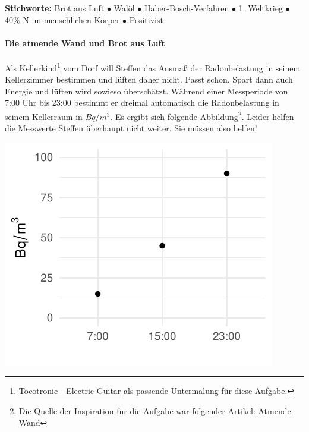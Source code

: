 \documentclass[a4paper, 9pt]{scrartcl}\usepackage[]{graphicx}\usepackage[]{xcolor}
\makeatletter
\def\maxwidth{ %
  \ifdim\Gin@nat@width>\linewidth
    \linewidth
  \else
    \Gin@nat@width
  \fi
}
\newenvironment{knitrout}{}{} %
\makeatother
\begin{document}
{\tiny\textbf{Stichworte:} Brot aus Luft $\bullet$ Walöl $\bullet$ Haber-Bosch-Verfahren $\bullet$ 1. Weltkrieg $\bullet$ 40\% N im menschlichen Körper $\bullet$ Positivist}




\paragraph{Die atmende Wand und Brot aus Luft}



Als Kellerkind\footnote{\href{https://www.youtube.com/watch?v=54H0HAJexVI}{Tocotronic - Electric Guitar} als passende Untermalung für diese Aufgabe.} vom Dorf will Steffen das Ausmaß der Radonbelastung in seinem Kellerzimmer bestimmen und lüften daher nicht. Passt schon. Spart dann auch Energie und lüften wird sowieso überschätzt. Während einer Messperiode von 7:00 Uhr bis 23:00 bestimmt er dreimal automatisch die Radonbelastung in seinem Kellerraum in $Bq/m^3$. Es ergibt sich folgende Abbildung\footnote{Die Quelle der Inspiration für die Aufgabe war folgender Artikel: \href{https://de.wikipedia.org/wiki/Atmende_Wand}{Atmende Wand}}. Leider helfen die Messwerte Steffen überhaupt nicht weiter. Sie müssen also helfen! 

\begin{knitrout}
\color{fgcolor}

{\centering \includegraphics[width=\maxwidth]{img/math-10-1} 

}


\end{knitrout}
\end{document}
